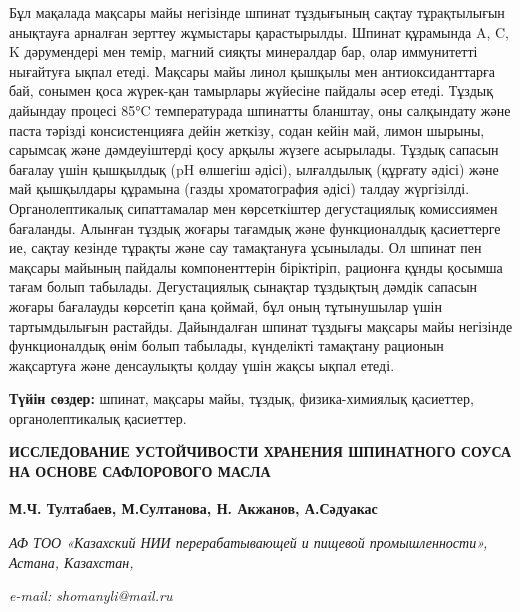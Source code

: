 {Бұл мақалада мақсары майы негізінде шпинат тұздығының сақтау
тұрақтылығын анықтауға арналған зерттеу жұмыстары қарастырылды. Шпинат
құрамында A, C, K дәрумендері мен темір, магний сияқты минералдар бар,
олар иммунитетті нығайтуға ықпал етеді. Мақсары майы линол қышқылы мен
антиоксиданттарға бай, сонымен қоса жүрек-қан тамырлары жүйесіне пайдалы
әсер етеді. Тұздық дайындау процесі 85°C температурада шпинатты
бланштау, оны салқындату және паста тәрізді консистенцияға дейін
жеткізу, содан кейін май, лимон шырыны, сарымсақ және дәмдеуіштерді қосу
арқылы жүзеге асырылады. Тұздық сапасын бағалау үшін қышқылдық (pH
өлшегіш әдісі), ылғалдылық (құрғату әдісі) және май қышқылдары құрамына
(газды хроматография әдісі) талдау жүргізілді. Органолептикалық
сипаттамалар мен көрсеткіштер дегустациялық комиссиямен бағаланды.
Алынған тұздық жоғары тағамдық және функционалдық қасиеттерге ие, сақтау
кезінде тұрақты және сау тамақтануға ұсынылады. Ол шпинат пен мақсары
майының пайдалы компоненттерін біріктіріп, рационға құнды қосымша тағам
болып табылады. Дегустациялық сынақтар тұздықтың дәмдік сапасын жоғары
бағалауды көрсетіп қана қоймай, бұл оның тұтынушылар үшін тартымдылығын
растайды. Дайындалған шпинат тұздығы мақсары майы негізінде
функционалдық өнім болып табылады, күнделікті тамақтану рационын
жақсартуға және денсаулықты қолдау үшін жақсы ықпал етеді.

{\bfseries Түйін сөздер:} шпинат, мақсары майы, тұздық, физика-химиялық
қасиеттер, органолептикалық қасиеттер.

{\bfseries ИССЛЕДОВАНИЕ УСТОЙЧИВОСТИ ХРАНЕНИЯ ШПИНАТНОГО СОУСА НА ОСНОВЕ
САФЛОРОВОГО МАСЛА}

{\bfseries \textsuperscript{\envelope }М.Ч. Тултабаев, М.Султанова, Н. Акжанов,
А.Сәдуакас}

\emph{АФ ТОО «Казахский НИИ перерабатывающей и пищевой
промышленности»,\\
Астана, Казахстан,}

\emph{e-mail: shomanyli@mail.ru}

}
